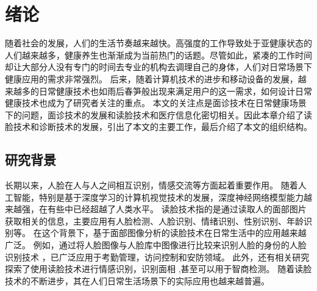 \chapter{绪论}

随着社会的发展，人们的生活节奏越来越快。高强度的工作导致处于亚健康状态的人们越来越多，健康养生也渐渐成为当前热门的话题。尽管如此，紧凑的工作时间却让大部分人没有专门的时间去专业的机构去调理自己的身体，人们对日常场景下健康应用的需求非常强烈。
后来，随着计算机技术的进步和移动设备的发展，越来越多的日常健康技术也如雨后春笋般出现来满足用户的这一需求，如何设计日常健康技术也成为了研究者关注的重点。
本文的关注点是面诊技术在日常健康场景下的问题，面诊技术的发展和读脸技术和医疗信息化密切相关。因此本章介绍了读脸技术和诊断技术的发展，引出了本文的主要工作，最后介绍了本文的组织结构。

\section{研究背景}

长期以来，人脸在人与人之间相互识别，情感交流等方面起着重要作用。
随着人工智能，特别是基于深度学习的计算机视觉技术的发展，深度神经网络模型能力越来越强，在有些中已经超越了人类水平\cite{he2015delving}。
读脸技术指的是通过读取人的面部图片获取相关的信息，主要应用有人脸检测、人脸识别、情绪识别、性别识别、年龄识别等。
在这个背景下，基于面部图像分析的读脸技术在日常生活中的应用越来越广泛。
例如，通过将人脸图像与人脸库中图像进行比较来识别人脸的身份的人脸识别技术 \cite{Zhang2016Joint}\cite{Schroff2015FaceNet}，已广泛应用于考勤管理\cite{surekha2017attendance}，访问控制\cite{atick2000continuous}和安防领域\cite{liu2005ibotguard}。
此外，还有相关研究探索了使用读脸技术进行情感识别\cite{corneanu2016survey}，识别面相 \cite{Li2007Online}\cite{Tempark2012Chinese},甚至可以用于智商检测\cite{Kleisner2014Perceived}。
随着读脸技术的不断进步，其在人们日常生活场景下的实际应用也越来越普遍。

